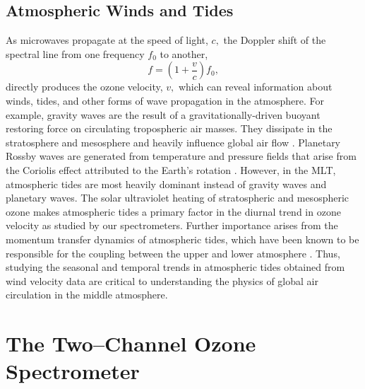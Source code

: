 \documentclass[11pt]{article}
\begin{document}
\subsection{Atmospheric Winds and Tides}	
As microwaves propagate at the speed of light, $c,$ the Doppler shift of the spectral line from one frequency $f_0$ to another,
\begin{equation}\label{Dp}
	f  = \left(1+\frac{v}{c}\right)f_0,
\end{equation}
directly produces the ozone velocity, $v,$ which can reveal information about winds, tides, and other forms of wave propagation in the atmosphere. For example, gravity waves are the result of a gravitationally-driven buoyant restoring force on circulating tropospheric air masses. They dissipate in the stratosphere and mesosphere and heavily influence global air flow \cite{PhysAtmos}\cite{Sandford2010}. Planetary Rossby waves are generated from temperature and pressure fields that arise from the Coriolis effect attributed to the Earth's rotation \cite{PhysAtmos}. However, in the MLT, atmospheric tides are most heavily dominant instead of gravity waves and planetary waves. The solar ultraviolet heating of stratospheric and mesospheric ozone makes atmospheric tides a primary factor in the diurnal trend in ozone velocity as studied by our spectrometers. Further importance arises from the momentum transfer dynamics of atmospheric tides, which have been known to be responsible for the coupling between the upper and lower atmosphere \cite{Davis2013}\cite{Sandford2010}. Thus, studying the seasonal and temporal trends in atmospheric tides obtained from wind velocity data are critical to understanding the physics of global air circulation in the middle atmosphere.
\section{The Two--Channel Ozone Spectrometer}
\end{document}
